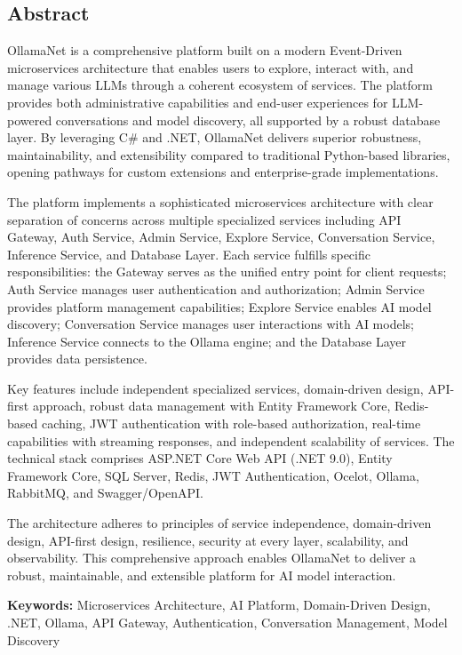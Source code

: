 \thispagestyle{fancy}
\fancyhf{}
\renewcommand{\headrulewidth}{0pt}
\fancyfoot[C]{\thepage}
\vspace*{\fill}

\begin{center}
    \section*{Abstract}
\end{center}

OllamaNet is a comprehensive platform built on a modern Event-Driven microservices architecture that enables users to explore, interact with, and manage various LLMs through a coherent ecosystem of services. The platform provides both administrative capabilities and end-user experiences for LLM-powered conversations and model discovery, all supported by a robust database layer. By leveraging C\# and .NET, OllamaNet delivers superior robustness, maintainability, and extensibility compared to traditional Python-based libraries, opening pathways for custom extensions and enterprise-grade implementations.

The platform implements a sophisticated microservices architecture with clear separation of concerns across multiple specialized services including API Gateway, Auth Service, Admin Service, Explore Service, Conversation Service, Inference Service, and Database Layer. Each service fulfills specific responsibilities: the Gateway serves as the unified entry point for client requests; Auth Service manages user authentication and authorization; Admin Service provides platform management capabilities; Explore Service enables AI model discovery; Conversation Service manages user interactions with AI models; Inference Service connects to the Ollama engine; and the Database Layer provides data persistence.

Key features include independent specialized services, domain-driven design, API-first approach, robust data management with Entity Framework Core, Redis-based caching, JWT authentication with role-based authorization, real-time capabilities with streaming responses, and independent scalability of services. The technical stack comprises ASP.NET Core Web API (.NET 9.0), Entity Framework Core, SQL Server, Redis, JWT Authentication, Ocelot, Ollama, RabbitMQ, and Swagger/OpenAPI.

The architecture adheres to principles of service independence, domain-driven design, API-first design, resilience, security at every layer, scalability, and observability. This comprehensive approach enables OllamaNet to deliver a robust, maintainable, and extensible platform for AI model interaction.

\textbf{Keywords:} Microservices Architecture, AI Platform, Domain-Driven Design, .NET, Ollama, API Gateway, Authentication, Conversation Management, Model Discovery

\vspace*{\fill}



